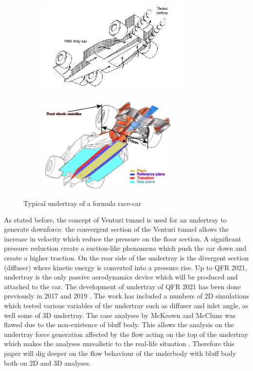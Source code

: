 \begin{figure}[!ht]
\begin{center}
%    
  \begin{subfigure}[b]{0.4\textwidth}
    \includegraphics[height=4.8cm]{Figures/underbody.PNG}
  \end{subfigure}
  \begin{subfigure}[b]{0.4\textwidth}
    \includegraphics[height=4.8cm]{Figures/undertray_f1.png}
  \end{subfigure}
%  
  \caption{Typical undertray of a formula race-car \cite{Katz1995RaceSpeed}\cite{AnonymousUndertrayUnderbody}}
    \label{fig:underbody}
\end{center}
\end{figure}

\noindent As stated before, the concept of Venturi tunnel is used for an undertray to generate downforce. the convergent section of the Venturi tunnel allows the increase in velocity which reduce the pressure on the floor section. A significant pressure reduction create a suction-like phenomena which push the car down and create a higher traction. On the rear side of the undertray is the divergent section (diffuser) where kinetic energy is converted into a pressure rise. 
\noindent Up to QFR 2021, undertray is the only passive aerodynamics device which will be produced and attached to the car. The development of undertray of QFR 2021 has been done previously in 2017 \cite{McKeown2018DesignCar} and 2019 \cite{McClune2018DesignCar}. The work has included a numbers of 2D simulations which tested various variables of the undertray such as diffuser and inlet angle, as well some of 3D undertray. The case analyses by McKeown \cite{McKeown2018DesignCar} and McClune \cite{McClune2018DesignCar} was flawed due to the non-existence of bluff body. This allows the analysis on the undertray force generation affected by the flow acting on the top of the undertray which makes the analyses unrealistic to the real-life situation \cite{Corr2017MechanicalAuthor}. Therefore this paper will dig deeper on the flow behaviour of the underbody with bluff body both on 2D and 3D analyses. 

